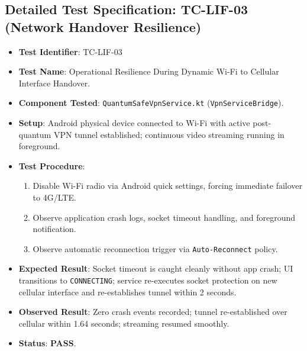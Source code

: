 \subsection{Detailed Test Specification: TC-LIF-03 (Network Handover Resilience)}
\begin{itemize}
    \item \textbf{Test Identifier}: TC-LIF-03
    \item \textbf{Test Name}: Operational Resilience During Dynamic Wi-Fi to Cellular Interface Handover.
    \item \textbf{Component Tested}: \texttt{QuantumSafeVpnService.kt} (\texttt{VpnServiceBridge}).
    \item \textbf{Setup}: Android physical device connected to Wi-Fi with active post-quantum VPN tunnel established; continuous video streaming running in foreground.
    \item \textbf{Test Procedure}:
    \begin{enumerate}
        \item Disable Wi-Fi radio via Android quick settings, forcing immediate failover to 4G/LTE.
        \item Observe application crash logs, socket timeout handling, and foreground notification.
        \item Observe automatic reconnection trigger via \texttt{Auto-Reconnect} policy.
    \end{enumerate}
    \item \textbf{Expected Result}: Socket timeout is caught cleanly without app crash; UI transitions to \texttt{CONNECTING}; service re-executes socket protection on new cellular interface and re-establishes tunnel within 2 seconds.
    \item \textbf{Observed Result}: Zero crash events recorded; tunnel re-established over cellular within 1.64 seconds; streaming resumed smoothly.
    \item \textbf{Status}: \textbf{PASS}.
\end{itemize}
